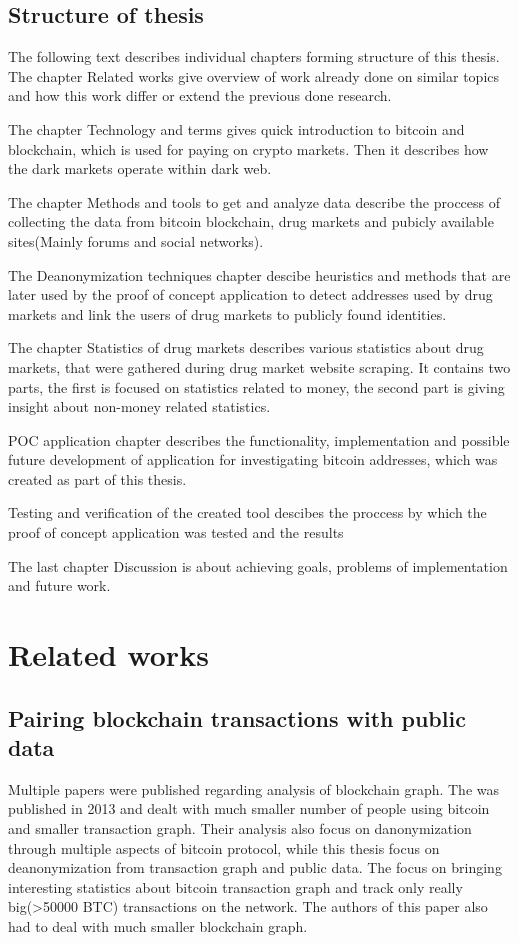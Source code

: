 \documentclass[
  digital, %
  table,   %
  lof,     %
  lot,     %
  oneside
]{fithesis3}
\begin{document}
\section{Structure of thesis}

The following text describes individual chapters forming structure of this thesis.
The chapter Related works give overview of work already done on similar topics and 
how this work differ or extend the previous done research.

The chapter Technology and terms gives quick introduction to bitcoin and blockchain, which is used for paying on crypto markets.
Then it describes how the dark markets operate within dark web.

The chapter Methods and tools to get and analyze data describe the proccess of collecting the data from bitcoin blockchain,
drug markets and pubicly available sites(Mainly forums and social networks). 

The Deanonymization techniques chapter descibe heuristics and methods that are later used by the proof of concept application to detect 
addresses used by drug markets and link the users of drug markets to publicly found identities.

The chapter Statistics of drug markets describes various statistics about drug markets, that were gathered during drug market website scraping.
It contains two parts, the first is focused on statistics related to money, the second part is giving insight about non-money related statistics.

POC application chapter describes the functionality, implementation and 
possible future development of application for investigating bitcoin addresses, which was created as part of this thesis.

Testing and verification of the created tool descibes the proccess by which the proof of concept application was tested and the results

The last chapter Discussion is about achieving goals, problems of implementation and future work.

\chapter{Related works}
\section{Pairing blockchain transactions with public data}
Multiple papers were published regarding analysis of blockchain graph. The \parencite{reid2013analysis} was published in 2013 and dealt with much smaller number of people using bitcoin and smaller transaction graph.
Their analysis also focus on danonymization through multiple aspects of bitcoin protocol, while this thesis focus on deanonymization from transaction graph and public data.
The \parencite{ron2013quantitative} focus on bringing interesting statistics about bitcoin transaction graph and track only really big(>50000 BTC)
transactions on the network. The authors of this paper also had to deal with much smaller blockchain graph.
\end{document}
